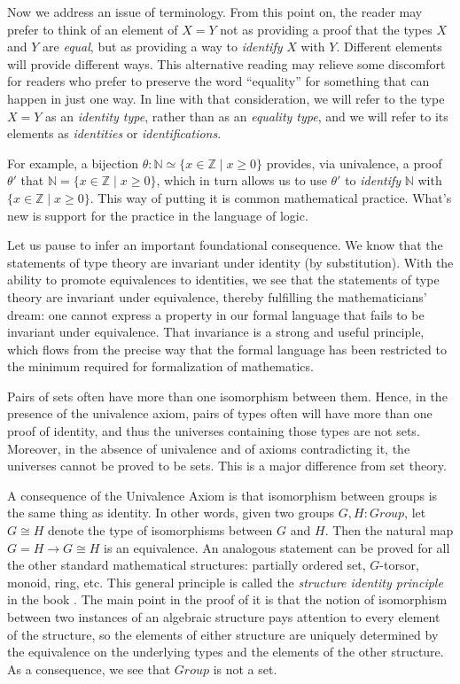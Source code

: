 \documentclass[letter,12pt]{amsart}
\theoremstyle{definition}
\theoremstyle{remark}
\numberwithin{equation}{section}
\newcommand{\weq}{\simeq}
\newcommand{\ZZ}{\mathbb{Z}}
\newcommand{\NN}{\mathbb{N}}
\newcommand{\isom}{\cong}
\begin{document}
Now we address an issue of terminology.  From this point on, the reader may prefer to think of an element of $X=Y$ not as providing a proof that
the types $X$ and $Y$ are {\em equal}, but as providing a way to {\em identify} $X$ with $Y$.  Different elements will provide different ways.
This alternative reading may relieve some discomfort for readers who prefer to preserve the word ``equality'' for something that can happen in
just one way.  In line with that consideration, we will refer to the type $X=Y$ as an {\em identity type}, rather than as an {\em equality
  type}, and we will refer to its elements as {\em identities} or {\em identifications}.
\par
For example, a bijection $\theta : \NN \weq \{ x \in \ZZ \mid x \ge 0 \}$ provides, via univalence, a proof $\theta'$ that
$\NN = \{ x \in \ZZ \mid x \ge 0 \}$, which in turn allows us to use $\theta'$ to {\em identify} $\NN$ with $\{ x \in \ZZ \mid x \ge 0 \}$.
This way of putting it is common mathematical practice.  What's new is support for the practice in the language of logic.
\par
Let us pause to infer an important foundational consequence.  We know that the statements of type theory are invariant under identity (by
substitution).  With the ability to promote equivalences to identities, we see that the statements of type theory are invariant under
equivalence, thereby fulfilling the mathematicians' dream: one cannot express a property in our formal language that fails to be invariant under
equivalence.  That invariance is a strong and useful principle, which flows from the precise way that the formal language has been restricted to
the minimum required for formalization of mathematics.

Pairs of sets often have more than one isomorphism between them.  Hence, in the presence of the univalence axiom, pairs of types often will have
more than one proof of identity, and thus the universes containing those types are not sets.  Moreover, in the absence of univalence and of
axioms contradicting it, the
universes cannot be proved to be sets.  This is a major difference from set theory.

A consequence of the Univalence Axiom is that isomorphism between groups is the same thing as identity.  In other words, given two groups $G, H
: Group$, let $G \isom H$ denote the type of isomorphisms between $G$ and $H$.  Then the natural map $G = H \to G \isom H$ is an equivalence.  An
analogous statement can be proved for all the other standard mathematical structures: partially ordered set, $G$-torsor, monoid, ring, etc.
This general principle is called the {\em structure identity principle} in the book \citep[section 9.8]{hottbook}.  The main point in the proof
of it is that the notion of isomorphism between two instances of an algebraic structure pays attention to every element of the structure, so the
elements of either structure are uniquely determined by the equivalence on the underlying types and the elements of the other structure.  As a
consequence, we see that $Group$ is not a set.
\end{document}
